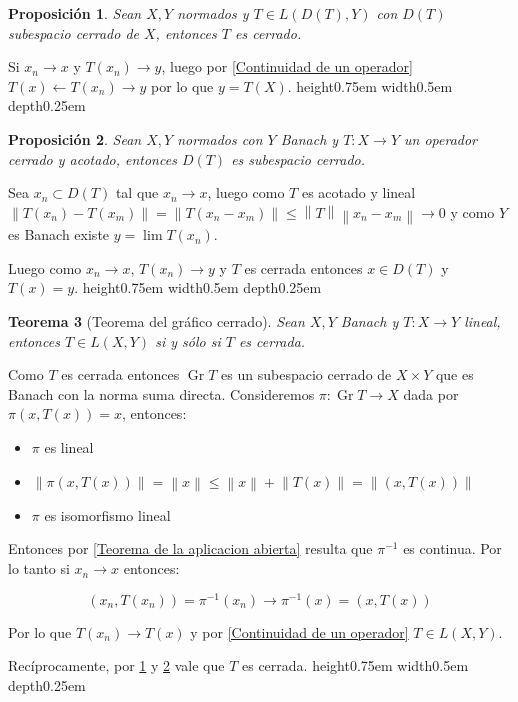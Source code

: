 \documentclass[11pt]{article}
\newcommand{\norm}[1]{\left\lVert#1\right\rVert}
\DeclareMathOperator{\graf}{Gr}
\newtheorem{theorem}{Teorema}
\numberwithin{theorem}{subsection}
\newtheorem{proposition}[theorem]{Proposici\'on}
\newenvironment{proof}[1][Demostraci\'on]{\begin{trivlist}
		\item[\hskip \labelsep {\bfseries #1}]}{\end{trivlist}}
\newcommand{\qed}{\nobreak \ifvmode \relax \else
	\ifdim\lastskip<1.5em \hskip-\lastskip
	\hskip1.5em plus0em minus0.5em \fi \nobreak
	\vrule height0.75em width0.5em depth0.25em\fi}
\begin{document}
\begin{proposition}
	\label{Lemma 1: Teo Grafico cerrado}
	Sean $X,Y$ normados y $T \in L(D(T),Y)$ con $D(T)$ subespacio cerrado de $X$, entonces $T$ es cerrado.
\end{proposition}

\begin{proof}
	Si $x_n \rightarrow x$ y $T(x_n) \rightarrow y$, luego por \ref{Continuidad de un operador} $T(x) \leftarrow T(x_n) \rightarrow y$ por lo que $y = T(X)$. \qed
\end{proof}

\begin{proposition}
	\label{Lemma 2: Teo Grafico cerrado}
	Sean $X,Y$ normados con $Y$ Banach y $T: X \rightarrow Y$ un operador cerrado y acotado, entonces $D(T)$ es subespacio cerrado.
\end{proposition}

\begin{proof}
	Sea $x_n \subset D(T)$ tal que $x_n \rightarrow x$, luego como $T$ es acotado y lineal $\norm{T(x_n) - T(x_m)} = \norm{T \left(x_n-x_m\right)} \leq \norm{T} \norm{x_n-x_m} \rightarrow 0$ y como $Y$ es Banach existe $y = \lim T(x_n)$.
	
	Luego como $x_n \rightarrow x$, $T(x_n) \rightarrow y$ y $T$ es cerrada entonces $x \in D(T)$ y $T(x) = y$. \qed
	
\end{proof}

\begin{theorem}[Teorema del gr\'afico cerrado]
	\label{Teorema del grafico cerrado}
	Sean $X,Y$ Banach y $T:X \rightarrow Y$ lineal, entonces $T \in L(X,Y)$ si y s\'olo si $T$ es cerrada. 
\end{theorem}

\begin{proof}
	Como $T$ es cerrada entonces $\graf T$ es un subespacio cerrado de $X \times Y$ que es Banach con la norma suma directa. Consideremos $\pi: \graf T \rightarrow X$ dada por $\pi(x,T(x)) = x$, entonces:
	
	\begin{itemize}
		\item $\pi$ es lineal
		\item $\norm{\pi(x,T(x))} = \norm{x} \leq \norm{x} + \norm{T(x)} = \norm{(x,T(x))}$
		\item $\pi$ es isomorfismo lineal
		
	\end{itemize}
	
	Entonces por \ref{Teorema de la aplicacion abierta} resulta que $\pi^{-1}$ es continua. Por lo tanto si $x_n \rightarrow x$ entonces:
	
	$$(x_n,T(x_n)) = \pi^{-1}(x_n) \rightarrow \pi^{-1}(x) = (x,T(x))$$
	
	Por lo que $T(x_n) \rightarrow T(x)$ y por \ref{Continuidad de un operador} $T \in L(X,Y)$.
	
	Rec\'iprocamente, por \ref{Lemma 1: Teo Grafico cerrado} y \ref{Lemma 2: Teo Grafico cerrado} vale que $T$ es cerrada. \qed
	
\end{proof}
\end{document}

